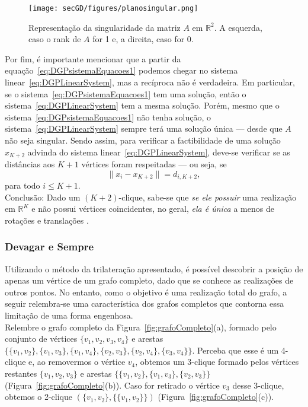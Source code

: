 \begin{figure}[H]
	\begin{center}
		\texttt{[image: secGD/figures/planosingular.png]}
	\end{center}
	\caption{Representação da singularidade da matriz $A$ em $\mathbb{R}^2$. A esquerda, caso o rank de $A$ for 1 e, a direita, caso for 0.}
	\label{fig:planosingular}
\end{figure}

Por fim, é importante mencionar que a partir da equação~\ref{eq:DGPsistemaEquacoes1} podemos chegar no sistema linear~\ref{eq:DGPLinearSystem}, mas a recíproca não é verdadeira. Em particular, se o sistema~\ref{eq:DGPsistemaEquacoes1} tem uma solução, então o sistema~\ref{eq:DGPLinearSystem} tem a mesma solução. Porém, mesmo que o sistema~\ref{eq:DGPsistemaEquacoes1} não tenha solução, o sistema~\ref{eq:DGPLinearSystem} sempre terá uma solução única --- desde que $A$ não seja singular. Sendo assim, para verificar a factibilidade de uma solução $x_{K+2}$ advinda do sistema linear~\ref{eq:DGPLinearSystem}, deve-se verificar se as distâncias aos $K+1$ vértices foram respeitadas --- ou seja, se $$\lVert x_i -x_{K+2} \rVert = d_{i,K+2},$$ para todo $i\leq K+1$. 
\\

Conclusão: Dado um $(K+2)$-clique, sabe-se que \textit{se ele possuir} uma realização em $\mathbb{R}^{K}$ e não possui vértices coincidentes, no geral, \textit{ela é única} a menos de rotações e translações \cite{hendrickson1992conditions, connelly1991generic}.

\subsubsection{Devagar e Sempre}

Utilizando o método da trilateração apresentado, é possível descobrir a posição de apenas um vértice de um grafo completo, dado que se conhece as realizações de outros pontos. No entanto, como o objetivo é uma realização total do grafo, a seguir relembra-se uma característica dos grafos completos que contorna essa limitação de uma forma engenhosa.
\\

Relembre o grafo completo da Figura~\ref{fig:grafoCompleto}(a), formado pelo conjunto de vértices $\{v_1,v_2,v_3,v_4\}$ e arestas $\{\{v_1,v_2\}, \{v_1,v_3\}, \{v_1,v_4\}, \{v_2,v_3\}, \{v_2,v_4\},\{v_3,v_4\}\}$. Perceba que esse é um 4-clique e, ao removermos o vértice $v_4$, obtemos um $3$-clique formado pelos vértices restantes $\{v_1,v_2,v_3\}$ e arestas $\{\{v_1,v_2\}, \{v_1,v_3\}, \{v_2,v_3\}\}$ (Figura~\ref{fig:grafoCompleto}(b)). Caso for retirado o vértice $v_3$ desse 3-clique, obtemos o 2-clique $(\{v_1, v_2\}, \{\{v_1,v_2\}\})$ (Figura~\ref{fig:grafoCompleto}(c)). 

